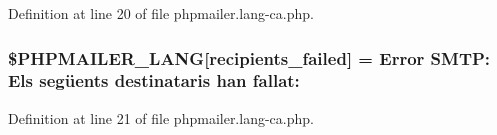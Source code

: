 Definition at line 20 of file phpmailer.\+lang-\/ca.\+php.

\subsubsection[{\texorpdfstring{\$\+P\+H\+P\+M\+A\+I\+L\+E\+R\+\_\+\+L\+A\+NG}{$PHPMAILER_LANG}}]{\setlength{\rightskip}{0pt plus 5cm}\$P\+H\+P\+M\+A\+I\+L\+E\+R\+\_\+\+L\+A\+NG\mbox{[}\textquotesingle{}recipients\+\_\+failed\textquotesingle{}\mbox{]} = \textquotesingle{}Error S\+M\+T\+P\+: Els següents destinataris han fallat\+: \textquotesingle{}}\hypertarget{phpmailer_8lang-ca_8php_a7589d30bb9b368327c2df015f3e6bcba}{}\label{phpmailer_8lang-ca_8php_a7589d30bb9b368327c2df015f3e6bcba}


Definition at line 21 of file phpmailer.\+lang-\/ca.\+php.

